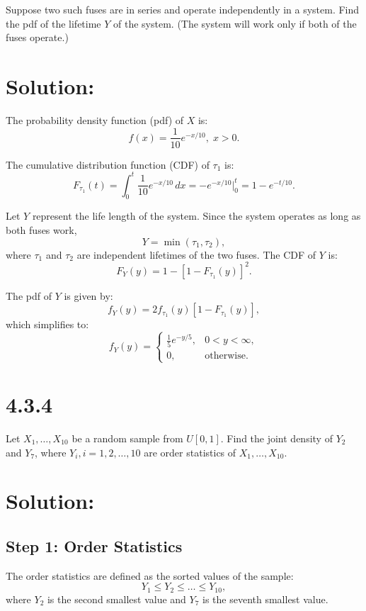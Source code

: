 \documentclass{article}
\begin{document}
Suppose two such fuses are in series and operate independently in a system. Find the pdf of the lifetime $Y$ of the system. (The system will work only if both of the fuses operate.)


\section*{Solution:}

The probability density function (pdf) of $X$ is:
\[
f(x) = \frac{1}{10}e^{-x/10}, \; x > 0.
\]

The cumulative distribution function (CDF) of $\tau_1$ is:
\[
F_{\tau_1}(t) = \int_0^t \frac{1}{10} e^{-x/10} \, dx = -e^{-x/10} \Big|_0^t = 1 - e^{-t/10}.
\]

Let $Y$ represent the life length of the system. Since the system operates as long as both fuses work, 
\[
Y = \min(\tau_1, \tau_2),
\]
where $\tau_1$ and $\tau_2$ are independent lifetimes of the two fuses. The CDF of $Y$ is:
\[
F_Y(y) = 1 - [1 - F_{\tau_1}(y)]^2.
\]

The pdf of $Y$ is given by:
\[
f_Y(y) = 2 f_{\tau_1}(y) [1 - F_{\tau_1}(y)],
\]
which simplifies to:
\[
f_Y(y) = 
\begin{cases} 
\frac{1}{5}e^{-y/5}, & 0 < y < \infty, \\
0, & \text{otherwise}.
\end{cases}
\]

\section*{4.3.4}

Let $X_1, \dots, X_{10}$ be a random sample from $U[0, 1]$. Find the joint density of $Y_2$ and $Y_7$, where $Y_i, i = 1, 2, \dots, 10$ are order statistics of $X_1, \dots, X_{10}$.


\section*{Solution:}

\subsection*{Step 1: Order Statistics}
The order statistics are defined as the sorted values of the sample:
\[
Y_1 \leq Y_2 \leq \dots \leq Y_{10},
\]
where $Y_2$ is the second smallest value and $Y_7$ is the seventh smallest value.
\end{document}
